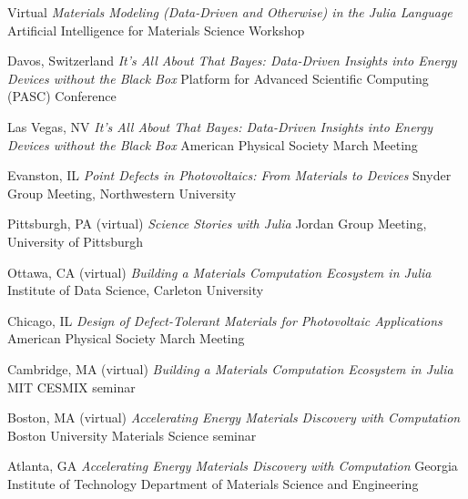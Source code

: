     {Virtual}
    {\textit{Materials Modeling (Data-Driven and Otherwise) in the Julia Language}}
    {Artificial Intelligence for Materials Science Workshop}

\vspace{\talksep}
\datedsubsection{}
    {Davos, Switzerland}
    {\textit{It's All About That Bayes: Data-Driven Insights into Energy Devices without the Black Box}}
    {Platform for Advanced Scientific Computing (PASC) Conference}

\vspace{\talksep}
\datedsubsection{}
    {Las Vegas, NV}
    {\textit{It's All About That Bayes: Data-Driven Insights into Energy Devices without the Black Box}}
    {American Physical Society March Meeting}

\vspace{\talksep}
\datedsubsection{}
    {Evanston, IL}
    {\textit{Point Defects in Photovoltaics: From Materials to Devices}}
    {Snyder Group Meeting, Northwestern University}

\vspace{\talkyearsep}
    {Pittsburgh, PA (virtual)}
    {\textit{Science Stories with Julia}}
    {Jordan Group Meeting, University of Pittsburgh}

\vspace{\talksep}
\datedsubsection{}
    {Ottawa, CA (virtual)}
    {\textit{Building a Materials Computation Ecosystem in Julia}}
    {Institute of Data Science, Carleton University}

\vspace{\talksep}
\datedsubsection{}
    {Chicago, IL}
    {\textit{Design of Defect-Tolerant Materials for Photovoltaic Applications}}
    {American Physical Society March Meeting}

\vspace{\talksep}
\datedsubsection{}
    {Cambridge, MA (virtual)}
    {\textit{Building a Materials Computation Ecosystem in Julia}}
    {MIT CESMIX seminar}

\vspace{\talksep}
\datedsubsection{}
    {Boston, MA (virtual)}
    {\textit{Accelerating Energy Materials Discovery with Computation}}
    {Boston University Materials Science seminar}

\vspace{\talkyearsep}
    {Atlanta, GA}
    {\textit{Accelerating Energy Materials Discovery with Computation}}
    {Georgia Institute of Technology Department of Materials Science and Engineering}

